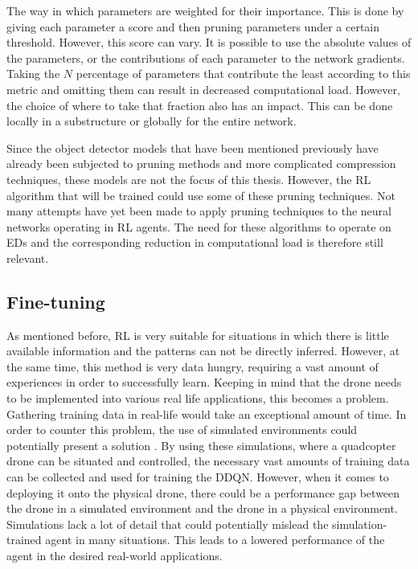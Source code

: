 The way in which parameters are weighted for their importance. This is done 
by giving each parameter a score and then pruning parameters under a certain 
threshold. However, this score can vary. It is possible to use the absolute values
of the parameters, or the contributions of each parameter to the network gradients. 
Taking the $N$ percentage of parameters that contribute the least according to this
metric and omitting them can result in decreased computational load. However, the 
choice of where to take that fraction also has an impact. This can be done locally 
in a substructure or globally for the entire network. 

Since the object detector models that have been mentioned previously have already 
been subjected to pruning methods and more complicated compression techniques, these 
models are not the focus of this thesis. However, the RL algorithm that will be 
trained could use some of these pruning techniques. Not many attempts have yet been 
made to apply pruning techniques to the neural networks operating in RL agents. 
The need for these algorithms to operate on EDs and the corresponding reduction 
in computational load is therefore still relevant. 

\subsection{Fine-tuning}
As mentioned before, RL is very suitable for situations 
in which there is little available information and the patterns can not be 
directly inferred. However, at the same time, this method is very data hungry, 
requiring a vast amount of experiences in order to successfully learn. Keeping in
mind that the drone needs to be implemented into various real life applications,
this becomes a problem. Gathering training data in real-life would take an 
exceptional amount of time. In order to counter this problem, the use of 
simulated environments could potentially present a solution \cite{DroneRLUsingTransferLearning}. By using these simulations, 
where a quadcopter drone can be situated and controlled, the necessary vast 
amounts of training data can be collected and used for training the DDQN. However, 
when it comes to deploying it onto the physical drone, there could 
be a performance gap between the drone in a simulated environment and the drone in a 
physical environment. Simulations lack a lot of detail that could potentially mislead the 
simulation-trained agent in many situations. This leads to a lowered performance of 
the agent in the desired real-world applications. 

